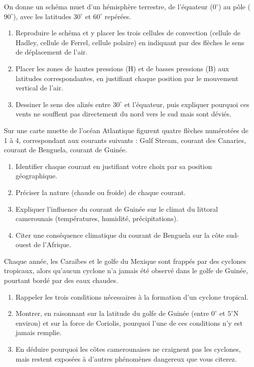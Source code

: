 \documentclass[11pt]{article}
\begin{document}
\begin{exercice}
On donne un schéma muet d'un hémisphère terrestre, de l'équateur ($0^\circ$) au pôle ($90^\circ$), avec les latitudes $30^\circ$ et $60^\circ$ repérées.
\begin{enumerate}
\item Reproduire le schéma et y placer les trois cellules de convection (cellule de Hadley, cellule de Ferrel, cellule polaire) en indiquant par des flèches le sens de déplacement de l'air.
\item Placer les zones de hautes pressions (H) et de basses pressions (B) aux latitudes correspondantes, en justifiant chaque position par le mouvement vertical de l'air.
\item Dessiner le sens des alizés entre $30^\circ$ et l'équateur, puis expliquer pourquoi ces vents ne soufflent pas directement du nord vers le sud mais sont déviés.
\end{enumerate}
\end{exercice}

\begin{exercice}
Sur une carte muette de l'océan Atlantique figurent quatre flèches numérotées de 1 à 4, correspondant aux courants suivants : Gulf Stream, courant des Canaries, courant de Benguela, courant de Guinée.
\begin{enumerate}
\item Identifier chaque courant en justifiant votre choix par sa position géographique.
\item Préciser la nature (chaude ou froide) de chaque courant.
\item Expliquer l'influence du courant de Guinée sur le climat du littoral camerounais (températures, humidité, précipitations).
\item Citer une conséquence climatique du courant de Benguela sur la côte sud-ouest de l'Afrique.
\end{enumerate}
\end{exercice}

\begin{exercice}
Chaque année, les Caraïbes et le golfe du Mexique sont frappés par des cyclones tropicaux, alors qu'aucun cyclone n'a jamais été observé dans le golfe de Guinée, pourtant bordé par des eaux chaudes.
\begin{enumerate}
\item Rappeler les trois conditions nécessaires à la formation d'un cyclone tropical.
\item Montrer, en raisonnant sur la latitude du golfe de Guinée (entre $0^\circ$ et $5^\circ$N environ) et sur la force de Coriolis, pourquoi l'une de ces conditions n'y est jamais remplie.
\item En déduire pourquoi les côtes camerounaises ne craignent pas les cyclones, mais restent exposées à d'autres phénomènes dangereux que vous citerez.
\end{enumerate}
\end{exercice}
\end{document}

